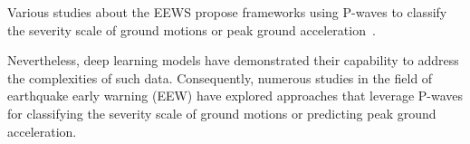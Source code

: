 


Various studies about the EEWS propose frameworks using P-waves to classify the severity scale of ground motions or peak ground acceleration~\cite{chiang2022neural, hsu2013rapid, yanwei2021deep, gasparini2007earthquake}. 

Nevertheless, deep learning models have demonstrated their capability to address the complexities of such data. Consequently, numerous studies in the field of earthquake early warning (EEW) have explored approaches that leverage P-waves for classifying the severity scale of ground motions or predicting peak ground acceleration.



